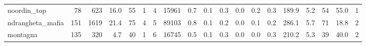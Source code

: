 \begin{tabular}{lrrrrrrrrrrrrrrrrrr}
noordin\_top         &     78 &    623 &         16.0 &          55 &           1 &         4 &      15961 &                 0.7 &            0.1 &           0.3 &           0.0 &      0.2 &             0.3 &           189.9 &                5.2 &            54 &          55.0 &             1 \\
ndrangheta\_mafia    &    151 &   1619 &         21.4 &          75 &           4 &         5 &      89103 &                 0.8 &            0.1 &           0.2 &           0.0 &      0.1 &             0.2 &           286.1 &                5.7 &            71 &          18.8 &             2 \\
montagna            &    135 &    320 &          4.7 &          40 &           1 &         6 &      16745 &                 0.5 &            0.1 &           0.3 &           0.0 &      0.0 &             0.3 &           210.2 &                5.3 &            39 &          40.0 &             2 \\
\bottomrule
\end{tabular}
